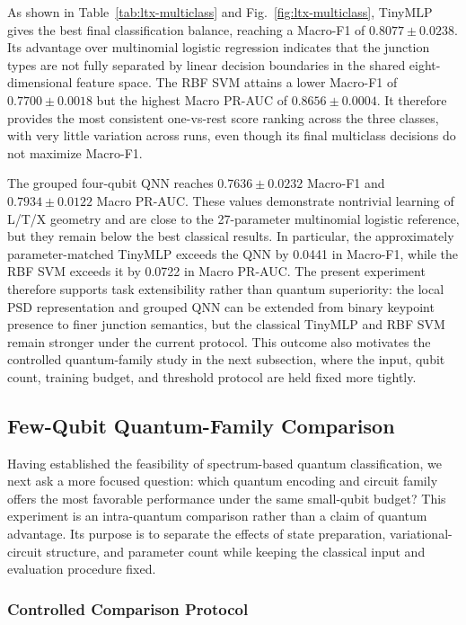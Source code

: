 \documentclass[11pt]{article}
\begin{document}
As shown in Table~\ref{tab:ltx-multiclass} and
Fig.~\ref{fig:ltx-multiclass}, TinyMLP gives the best final classification
balance, reaching a Macro-F1 of $0.8077\pm0.0238$. Its advantage over
multinomial logistic regression indicates that the junction types are not
fully separated by linear decision boundaries in the shared eight-dimensional
feature space. The RBF SVM attains a lower Macro-F1 of
$0.7700\pm0.0018$ but the highest Macro PR-AUC of
$0.8656\pm0.0004$. It therefore provides the most consistent one-vs-rest score
ranking across the three classes, with very little variation across runs, even
though its final multiclass decisions do not maximize Macro-F1.

The grouped four-qubit QNN reaches $0.7636\pm0.0232$ Macro-F1 and
$0.7934\pm0.0122$ Macro PR-AUC. These values demonstrate nontrivial learning
of L/T/X geometry and are close to the 27-parameter multinomial logistic
reference, but they remain below the best classical results. In particular,
the approximately parameter-matched TinyMLP exceeds the QNN by 0.0441 in
Macro-F1, while the RBF SVM exceeds it by 0.0722 in Macro PR-AUC. The present
experiment therefore supports task extensibility rather than quantum
superiority: the local PSD representation and grouped QNN can be extended from
binary keypoint presence to finer junction semantics, but the classical
TinyMLP and RBF SVM remain stronger under the current protocol. This outcome
also motivates the controlled quantum-family study in the next subsection,
where the input, qubit count, training budget, and threshold protocol are held
fixed more tightly.

\subsection{Few-Qubit Quantum-Family Comparison}
\label{sec:quantum-family}

Having established the feasibility of spectrum-based quantum classification,
we next ask a more focused question: which quantum encoding and circuit family
offers the most favorable performance under the same small-qubit budget?  This
experiment is an intra-quantum comparison rather than a claim of quantum
advantage.  Its purpose is to separate the effects of state preparation,
variational-circuit structure, and parameter count while keeping the classical
input and evaluation procedure fixed.

\subsubsection{Controlled Comparison Protocol}
\end{document}

